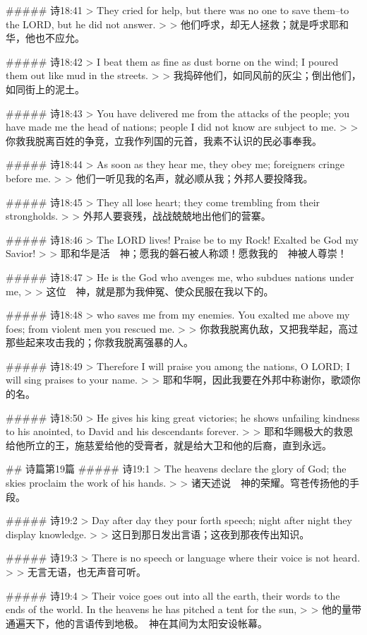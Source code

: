 ##### 诗18:41
> They cried for help, but there was no one to save them--to the LORD, but he did not answer.
>
> 他们呼求，却无人拯救；就是呼求耶和华，他也不应允。


##### 诗18:42
> I beat them as fine as dust borne on the wind; I poured them out like mud in the streets.
>
> 我捣碎他们，如同风前的灰尘；倒出他们，如同街上的泥土。


##### 诗18:43
> You have delivered me from the attacks of the people; you have made me the head of nations; people I did not know are subject to me.
>
> 你救我脱离百姓的争竞，立我作列国的元首，我素不认识的民必事奉我。


##### 诗18:44
> As soon as they hear me, they obey me; foreigners cringe before me.
>
> 他们一听见我的名声，就必顺从我；外邦人要投降我。


##### 诗18:45
> They all lose heart; they come trembling from their strongholds.
>
> 外邦人要衰残，战战兢兢地出他们的营寨。


##### 诗18:46
> The LORD lives! Praise be to my Rock! Exalted be God my Savior!
>
> 耶和华是活　神；愿我的磐石被人称颂！愿救我的　神被人尊崇！


##### 诗18:47
> He is the God who avenges me, who subdues nations under me,
>
> 这位　神，就是那为我伸冤、使众民服在我以下的。


##### 诗18:48
> who saves me from my enemies. You exalted me above my foes; from violent men you rescued me.
>
> 你救我脱离仇敌，又把我举起，高过那些起来攻击我的；你救我脱离强暴的人。


##### 诗18:49
> Therefore I will praise you among the nations, O LORD; I will sing praises to your name.
>
> 耶和华啊，因此我要在外邦中称谢你，歌颂你的名。


##### 诗18:50
> He gives his king great victories; he shows unfailing kindness to his anointed, to David and his descendants forever.
>
> 耶和华赐极大的救恩给他所立的王，施慈爱给他的受膏者，就是给大卫和他的后裔，直到永远。


## 诗篇第19篇
##### 诗19:1
> The heavens declare the glory of God; the skies proclaim the work of his hands.
>
> 诸天述说　神的荣耀。穹苍传扬他的手段。


##### 诗19:2
> Day after day they pour forth speech; night after night they display knowledge.
>
> 这日到那日发出言语；这夜到那夜传出知识。


##### 诗19:3
> There is no speech or language where their voice is not heard.
>
> 无言无语，也无声音可听。


##### 诗19:4
> Their voice goes out into all the earth, their words to the ends of the world. In the heavens he has pitched a tent for the sun,
>
> 他的量带通遍天下，他的言语传到地极。　神在其间为太阳安设帐幕。


